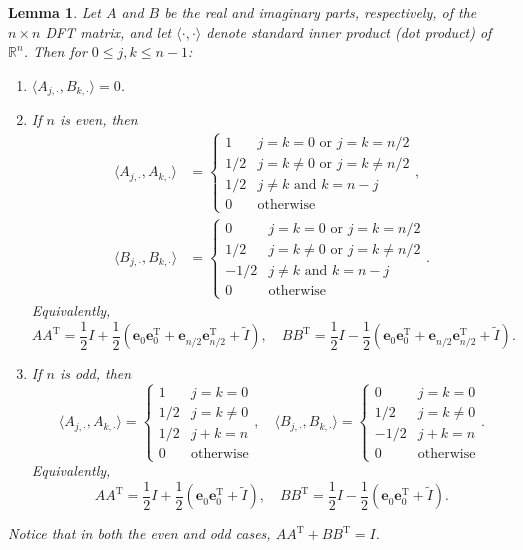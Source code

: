\documentclass[12pt]{article}
\newcommand{\trans}{\mathrm{T}}	%
\newtheorem{lemma}{Lemma}[section]
\begin{document}
\begin{lemma}
\label{lem:Inner products}
Let $A$ and $B$ be the real and imaginary parts, respectively, of the $n \times n$ DFT matrix, and let $\langle\cdot,\cdot\rangle$ denote standard inner product (dot product) of $\mathbb{R}^n$. Then for $0 \leq j,k \leq n-1$:
\begin{enumerate}[label=(\roman*)]
\item $\langle A_{j,\cdot}, B_{k,\cdot}\rangle = 0$.
\item If $n$ is even, then 
\begin{align*}
\langle A_{j,\cdot}, A_{k,\cdot}\rangle &= \begin{cases}
1 & j = k = 0 \text{ or } j = k = n/2 \\ 
1/2 & j = k \neq 0 \text{ or } j = k \neq n/2 \\ 
1/2 & j \neq k \text{ and } k = n - j \\ 
0 & \text{otherwise} \end{cases}, \\
\langle B_{j,\cdot}, B_{k,\cdot}\rangle &= \begin{cases}
0 & j = k = 0 \text{ or } j = k = n/2 \\ 
1/2 & j = k \neq 0 \text{ or } j = k \neq n/2 \\ 
-1/2 &  j \neq k \text{ and } k = n - j \\ 
0 & \text{otherwise} \end{cases}.
\end{align*}
Equivalently,
\[AA^\trans = \frac{1}{2}I + \frac{1}{2}\left(\bm{e}_0^{}\bm{e}_0^\trans + \bm{e}_{n/2}^{}\bm{e}_{n/2}^\trans + \tilde{I}\right), \quad BB^\trans = \frac{1}{2}I - \frac{1}{2}\left(\bm{e}_0^{}\bm{e}_0^\trans + \bm{e}_{n/2}^{}\bm{e}_{n/2}^\trans + \tilde{I}\right).\]
\item If $n$ is odd, then
\[\langle A_{j,\cdot}, A_{k,\cdot}\rangle = \begin{cases}
1 & j = k = 0 \\ 
1/2 & j = k \neq 0 \\
1/2 & j+k = n \\
0 & \text{otherwise} \end{cases}, \quad 
\langle B_{j,\cdot}, B_{k,\cdot}\rangle = \begin{cases}
0 & j = k = 0 \\ 
1/2 & j = k \neq 0 \\
-1/2 & j+k = n \\
0 & \text{otherwise} \end{cases}.\]
Equivalently,
\[AA^\trans = \frac{1}{2}I + \frac{1}{2}\left(\bm{e}_0^{}\bm{e}_0^\trans + \tilde{I}\right), \quad BB^\trans = \frac{1}{2}I - \frac{1}{2}\left(\bm{e}_0^{}\bm{e}_0^\trans + \tilde{I}\right).\]
\end{enumerate}
Notice that in both the even and odd cases, $AA^\trans + BB^\trans = I$.
\end{lemma}
\end{document}
